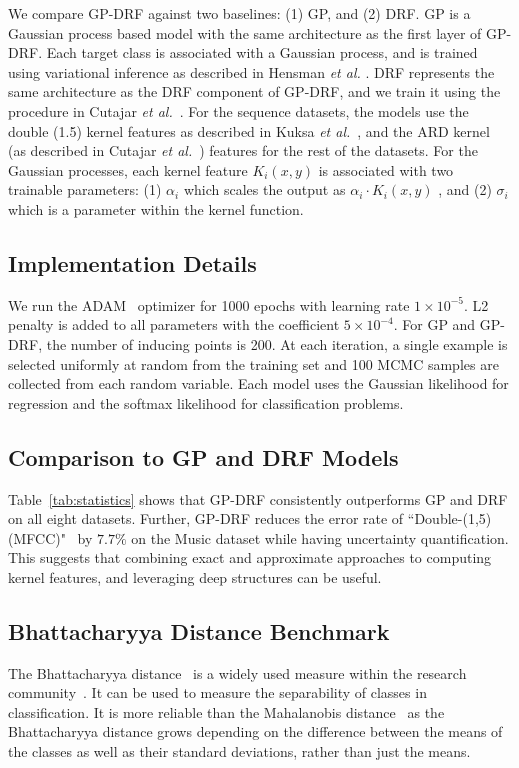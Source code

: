 \documentclass[conference]{IEEEtran}
\begin{document}
We compare GP-DRF against two baselines: (1) GP, and (2) DRF. GP is a Gaussian process based model with the same architecture as the first layer of GP-DRF. Each target class is associated with a Gaussian process, and is trained using variational inference as described in Hensman {\em et al.} \cite{hensman2015scalable}. DRF represents the same architecture as the DRF component of GP-DRF, and we train it using the procedure in Cutajar {\em et al.}~\cite{rfdnn17}. For the sequence datasets, the models use the double (1.5) kernel features as described in Kuksa {\em et al.}~\cite{kuksa2008kernel}, and the ARD kernel (as described in Cutajar {\em et al.}~\cite{rfdnn17}) features for the rest of the datasets. For the Gaussian processes, each kernel feature $K_i(x, y)$ is associated with two trainable parameters: (1) $\alpha_i$ which scales the output as $\alpha_i \cdot K_i(x, y)$ , and (2) $\sigma_i$ which is a parameter within the kernel function.

\subsection{Implementation Details}
We run the ADAM~\cite{kingma2014adam} optimizer for 1000 epochs with learning rate $1\times10^{-5}$. L2 penalty is added to all parameters with the coefficient $5\times10^{-4}$. For GP and GP-DRF, the number of inducing points is 200. At each iteration, a single example is selected uniformly at random from the training set and 100 MCMC samples are collected from each random variable. Each model uses the Gaussian likelihood for regression and the softmax likelihood for classification problems. 



\subsection{Comparison to GP and DRF Models}
Table~\ref{tab:statistics} shows that GP-DRF consistently outperforms GP and DRF on all eight datasets. Further, GP-DRF reduces the error rate of ``Double-(1,5) (MFCC)"~\cite{kuksa2008kernel} by $7.7\%$  on the Music dataset while having uncertainty quantification. This suggests that combining exact and approximate approaches to computing kernel features, and leveraging deep structures can be useful.


\subsection{Bhattacharyya Distance Benchmark}
The Bhattacharyya distance~\cite{bhattacharyya1946measure} is a widely used measure within the research community~\cite{schweppe1967state, choi2003feature, michailovich2007image}. It can be used to measure the separability of classes in classification. It is more reliable than the Mahalanobis distance~\cite{mahalanobis1936generalized} as the Bhattacharyya distance grows depending on the difference between the means of the classes as well as their standard deviations, rather than just the means.
\end{document}
